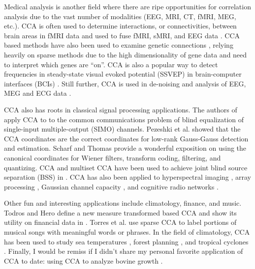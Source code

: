 Medical analysis is another field where there are ripe opportunities for correlation
analysis due to the vast number of modalities (EEG, MRI, CT, fMRI, MEG, etc.). CCA is
often used to determine interactions, or connectivities, between brain areas in fMRI data
\cite{deleus2011functional,arbabshirani2010comparison,khalid2013improving,guccione2013functional}
and used to fuse fMRI, sMRI, and EEG data \cite{correa2010canonical}. CCA based methods
have also been used to examine genetic connections
\cite{lin2013identifying,seoane2014canonical,lin2013group}, relying heavily on sparse
methods due to the high dimensionality of gene data and need to interpret which genes are
``on''. CCA is also a popular way to detect frequencies in steady-state visual evoked
potential (SSVEP) in brain-computer interfaces (BCIs)
\cite{zhang2013l1,nakanishi2014enhancing,zhang2014frequency}. Still further, CCA is used
in de-noising and analysis of EEG, MEG and ECG data
\cite{spuler2013spatial,campi2013non,chen2014removal,kuzilek2014comparison}.

CCA also has roots in classical signal processing applications. The authors of
\cite{via2005canonical} apply CCA to to the common communications problem of blind
equalization of single-input multiple-output (SIMO) channels. Pezeshki et al.
\cite{pezeshki2006canonical} showed that the CCA coordinates are the correct coordinates
for low-rank Gauss-Gauss detection and estimation. Scharf and Thomas
\cite{scharf1998wiener} provide a wonderful exposition on using the canonical coordinates
for Wiener filters, transform coding, filtering, and quantizing. CCA and multiset CCA have
been used to achieve joint blind source separation (BSS) in \cite{li2009joint}. CCA has
also been applied to hyperspectral imaging \cite{nielsen2002multiset}, array processing
\cite{ge2009does}, Gaussian channel capacity \cite{scharf2000canonical}, and cognitive
radio networks \cite{manco2014kernel}.

Other fun and interesting applications include climatology, finance, and music. Todros and
Hero define a new measure transformed based CCA and show its utility on financial data in
\cite{todros2012measure}. Torres et al. \cite{torres2007finding} use sparse CCA to label
portions of musical songs with meaningful words or phrases. In the field of climatology,
CCA has been used to study sea temperatures \cite{wilks2014probabilistic}, forest planning
\cite{prera2014using}, and tropical cyclones \cite{steward2014assimilating}. Finally, I
would be remiss if I didn't share my personal favorite application of CCA to date: using
CCA to analyze bovine growth \cite{li2010canonical}.

